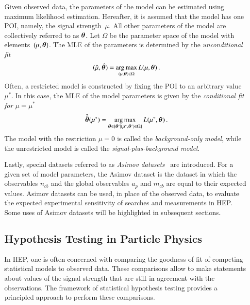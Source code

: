 Given observed data, the parameters of the model can be estimated using maximum
likelihood estimation. Hereafter, it is assumed that the model has one POI,
namely, the signal strength~$\mu$. All other parameters of the model are
collectively referred to as $\bm{\theta}$. Let $\Omega$ be the parameter
space of the model with elements~$(\mu, \bm{\theta})$. The MLE of the
parameters is determined by the \emph{unconditional fit}
\begin{align}
  (\hat{\mu}, \hat{\bm{\theta}}) = \operatorname*{arg\,max}_{(\mu, \bm{\theta}) \in \Omega} L(\mu, \bm{\theta}) \,\text{.}
  \label{eq:unconditional_fit}
\end{align}
Often, a restricted model is constructed by fixing the POI to an arbitrary value
$\mu^*$. In this case, the MLE of the model parameters is given by the
\emph{conditional fit for $\mu = \mu^*$}
\begin{align}
  \hat{\hat{\bm{\theta}}}(\mu^*) = \operatorname*{arg\,max}_{\bm{\theta} \in \{ \bm{\theta}^\prime \mid (\mu^*, \bm{\theta}^\prime) \in \Omega \} } L(\mu^*, \bm{\theta}) \,\text{.}
  \label{eq:conditional_fit}
\end{align}
The model with the restriction $\mu = 0$ is called the \emph{background-only
  model}, while the unrestricted model is called the
\emph{signal-plus-background model}.

Lastly, special datasets referred to as \emph{Asimov
  datasets}~\cite{Cowan:2010js} are introduced. For a given set of model
parameters, the Asimov dataset is the dataset in which the observables $n_{cb}$
and the global observables $a_p$ and $m_{cb}$ are equal to their expected
values. Asimov datasets can be used, in place of the observed data, to evaluate
the expected experimental sensitivity of searches and measurements in HEP. Some
uses of Asimov datasets will be highlighted in subsequent sections.


\subsection{Hypothesis Testing in Particle Physics}%
\label{sec:hypotesting}

In HEP, one is often concerned with comparing the goodness of fit of competing
statistical models to observed data. These comparisons allow to make statements
about values of the signal strength that are still in agreement with the
observations. The framework of statistical hypothesis testing provides a
principled approach to perform these comparisons.

